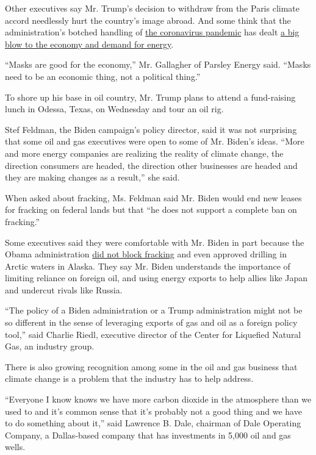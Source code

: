 Other executives say Mr. Trump's decision to withdraw from the Paris
climate accord needlessly hurt the country's image abroad. And some
think that the administration's botched handling of
\href{https://www.nytimes3xbfgragh.onion/news-event/coronavirus}{the
coronavirus pandemic} has dealt
\href{https://www.nytimes3xbfgragh.onion/2020/06/25/business/economy/texas-economy-oil-coronavirus.html}{a
big blow to the economy and demand for energy}.

``Masks are good for the economy,'' Mr. Gallagher of Parsley Energy
said. ``Masks need to be an economic thing, not a political thing.''

To shore up his base in oil country, Mr. Trump plans to attend a
fund-raising lunch in Odessa, Texas, on Wednesday and tour an oil rig.

Stef Feldman, the Biden campaign's policy director, said it was not
surprising that some oil and gas executives were open to some of Mr.
Biden's ideas. ``More and more energy companies are realizing the
reality of climate change, the direction consumers are headed, the
direction other businesses are headed and they are making changes as a
result,'' she said.

When asked about fracking, Ms. Feldman said Mr. Biden would end new
leases for fracking on federal lands but that ``he does not support a
complete ban on fracking.''

Some executives said they were comfortable with Mr. Biden in part
because the Obama administration
\href{https://archive.nytimes3xbfgragh.onion/www.nytimes3xbfgragh.onion/gwire/2010/12/14/14greenwire-obama-admin-wants-study-but-backs-northeast-sh-25319.html}{did
not block fracking} and even approved drilling in Arctic waters in
Alaska. They say Mr. Biden understands the importance of limiting
reliance on foreign oil, and using energy exports to help allies like
Japan and undercut rivals like Russia.

``The policy of a Biden administration or a Trump administration might
not be so different in the sense of leveraging exports of gas and oil as
a foreign policy tool,'' said Charlie Riedl, executive director of the
Center for Liquefied Natural Gas, an industry group.

There is also growing recognition among some in the oil and gas business
that climate change is a problem that the industry has to help address.

``Everyone I know knows we have more carbon dioxide in the atmosphere
than we used to and it's common sense that it's probably not a good
thing and we have to do something about it,'' said Lawrence B. Dale,
chairman of Dale Operating Company, a Dallas-based company that has
investments in 5,000 oil and gas wells.


